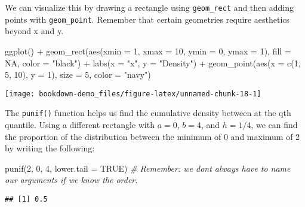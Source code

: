 \documentclass[
]{book}
\newenvironment{Shaded}{\begin{snugshade}}{\end{snugshade}}
\newcommand{\AttributeTok}[1]{\textcolor[rgb]{0.77,0.63,0.00}{#1}}
\newcommand{\CommentTok}[1]{\textcolor[rgb]{0.56,0.35,0.01}{\textit{#1}}}
\newcommand{\ConstantTok}[1]{\textcolor[rgb]{0.00,0.00,0.00}{#1}}
\newcommand{\DecValTok}[1]{\textcolor[rgb]{0.00,0.00,0.81}{#1}}
\newcommand{\FunctionTok}[1]{\textcolor[rgb]{0.00,0.00,0.00}{#1}}
\newcommand{\NormalTok}[1]{#1}
\newcommand{\SpecialCharTok}[1]{\textcolor[rgb]{0.00,0.00,0.00}{#1}}
\newcommand{\StringTok}[1]{\textcolor[rgb]{0.31,0.60,0.02}{#1}}
\begin{document}
We can visualize this by drawing a rectangle using \texttt{geom\_rect} and then adding points with \texttt{geom\_point}. Remember that certain geometries require aesthetics beyond x and y.

\begin{Shaded}
\begin{Highlighting}[]
\FunctionTok{ggplot}\NormalTok{() }\SpecialCharTok{+}
  \FunctionTok{geom\_rect}\NormalTok{(}\FunctionTok{aes}\NormalTok{(}\AttributeTok{xmin =} \DecValTok{1}\NormalTok{, }\AttributeTok{xmax =} \DecValTok{10}\NormalTok{, }\AttributeTok{ymin =} \DecValTok{0}\NormalTok{, }\AttributeTok{ymax =} \DecValTok{1}\NormalTok{), }\AttributeTok{fill =} \ConstantTok{NA}\NormalTok{, }
            \AttributeTok{color =} \StringTok{"black"}\NormalTok{) }\SpecialCharTok{+}
  \FunctionTok{labs}\NormalTok{(}\AttributeTok{x =} \StringTok{"x"}\NormalTok{, }\AttributeTok{y =} \StringTok{"Density"}\NormalTok{) }\SpecialCharTok{+}
  \FunctionTok{geom\_point}\NormalTok{(}\FunctionTok{aes}\NormalTok{(}\AttributeTok{x =} \FunctionTok{c}\NormalTok{(}\DecValTok{1}\NormalTok{, }\DecValTok{5}\NormalTok{, }\DecValTok{10}\NormalTok{), }\AttributeTok{y =} \DecValTok{1}\NormalTok{), }\AttributeTok{size =} \DecValTok{5}\NormalTok{, }\AttributeTok{color =} \StringTok{"navy"}\NormalTok{)}
\end{Highlighting}
\end{Shaded}

\begin{center}\texttt{[image: bookdown-demo\_files/figure-latex/unnamed-chunk-18-1]} \end{center}

The \texttt{punif()} function helps us find the cumulative density between at the qth quantile. Using a different rectangle with \(a = 0\), \(b = 4\), and \(h = 1/4\), we can find the proportion of the distribution between the minimum of 0 and maximum of 2 by writing the following:

\begin{Shaded}
\begin{Highlighting}[]
\FunctionTok{punif}\NormalTok{(}\DecValTok{2}\NormalTok{, }\DecValTok{0}\NormalTok{, }\DecValTok{4}\NormalTok{, }\AttributeTok{lower.tail =} \ConstantTok{TRUE}\NormalTok{) }\CommentTok{\# Remember: we don\textquotesingle{}t always have to name our arguments if we know the order.}
\end{Highlighting}
\end{Shaded}

\begin{verbatim}
## [1] 0.5
\end{verbatim}
\end{document}
